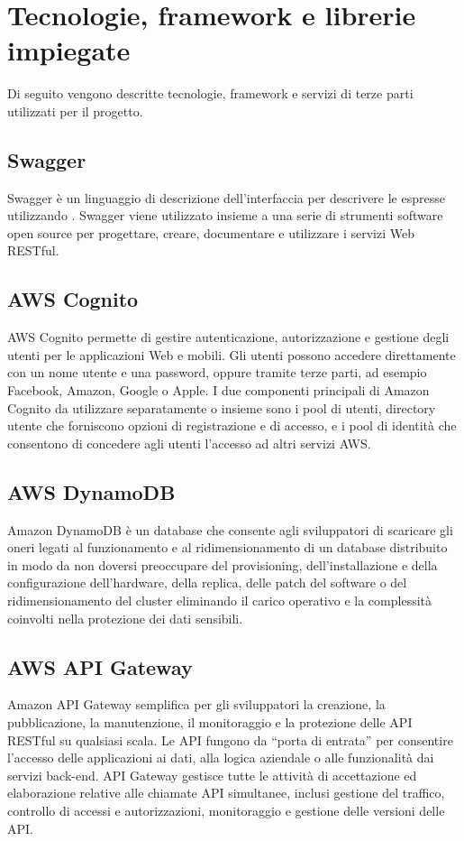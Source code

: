 \section{Tecnologie, framework e librerie impiegate}\label{Tecnologie}
Di seguito vengono descritte tecnologie, framework e servizi di terze parti utilizzati per il progetto.
\subsection{Swagger}
Swagger è un linguaggio di descrizione dell'interfaccia per descrivere le   espresse utilizzando . Swagger viene utilizzato insieme a una serie di strumenti software open source per progettare, creare, documentare e utilizzare i servizi Web RESTful.
\subsection{AWS Cognito}
AWS Cognito permette di gestire autenticazione, autorizzazione e gestione degli utenti per le applicazioni Web e mobili. Gli utenti possono accedere direttamente con un nome utente e una password, oppure tramite terze parti, ad esempio Facebook, Amazon, Google o Apple.
I due componenti principali di Amazon Cognito da utilizzare separatamente o insieme sono i pool di utenti, directory utente che forniscono opzioni di registrazione e di accesso, e i pool di identità che consentono di concedere agli utenti l'accesso ad altri servizi AWS.
\subsection{AWS DynamoDB} 
Amazon DynamoDB è un database  che consente agli sviluppatori di scaricare gli oneri legati al funzionamento e al ridimensionamento di un database distribuito in modo da non doversi preoccupare del provisioning, dell'installazione e della configurazione dell'hardware, della replica, delle patch del software o del ridimensionamento del cluster eliminando il carico operativo e la complessità coinvolti nella protezione dei dati sensibili. 

\subsection{AWS API Gateway}
Amazon API Gateway semplifica per gli sviluppatori la creazione, la pubblicazione, la manutenzione, il monitoraggio e la protezione delle API RESTful su qualsiasi scala. Le API fungono da “porta di entrata” per consentire l’accesso delle applicazioni ai dati, alla logica aziendale o alle funzionalità dai servizi back-end. 
API Gateway gestisce tutte le attività di accettazione ed elaborazione relative alle chiamate API simultanee, inclusi gestione del traffico, controllo di accessi e autorizzazioni, monitoraggio e gestione delle versioni delle API. 

